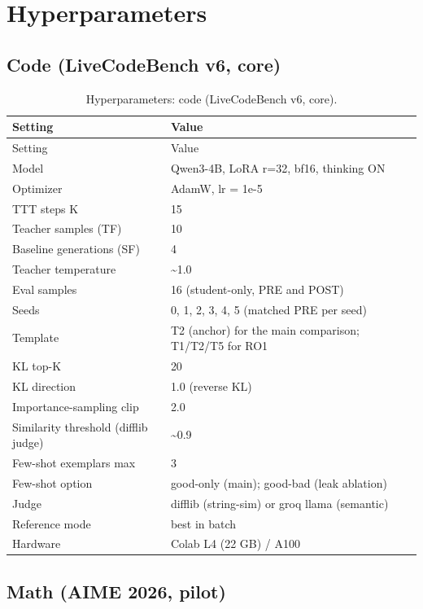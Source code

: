\chapter{Hyperparameters}\label{appendix-a-hyperparameters}

\section{Code (LiveCodeBench v6, core)}\label{a.1-code-livecodebench-v6-core}

\begingroup\setlength{\tabcolsep}{3pt}
\begin{longtable}{ll}
\caption{Hyperparameters: code (LiveCodeBench v6, core).}\\
\toprule
Setting & Value \\
\midrule
\endfirsthead
\toprule
Setting & Value \\
\midrule
\endhead
\bottomrule
\endfoot
Model & Qwen3-4B, LoRA r=32, bf16, thinking ON \\
Optimizer & AdamW, lr = 1e-5 \\
TTT steps K & 15 \\
Teacher samples (TF) & 10 \\
Baseline generations (SF) & 4 \\
Teacher temperature & \textasciitilde1.0 \\
Eval samples & 16 (student-only, PRE and POST) \\
Seeds & 0, 1, 2, 3, 4, 5 (matched PRE per seed) \\
Template & T2 (anchor) for the main comparison; T1/T2/T5 for RO1 \\
KL top-K & 20 \\
KL direction & 1.0 (reverse KL) \\
Importance-sampling clip & 2.0 \\
Similarity threshold (difflib judge) & \textasciitilde0.9 \\
Few-shot exemplars max & 3 \\
Few-shot option & good-only (main); good-bad (leak ablation) \\
Judge & difflib (string-sim) or groq llama (semantic) \\
Reference mode & best in batch \\
Hardware & Colab L4 (22 GB) / A100 \\
\end{longtable}\endgroup

\section{Math (AIME 2026, pilot)}\label{a.2-math-aime-2026-pilot}

